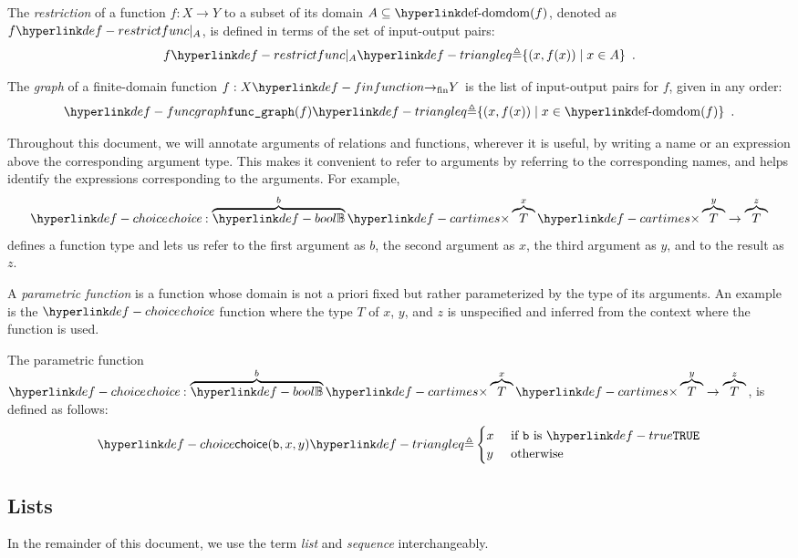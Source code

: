 \begin{definition}
\hypertarget{def-restrictfunc}{}
The \emph{restriction} of a function $f : X \rightarrow Y$ to a subset of its domain
$A \subseteq \dom(f)$, denoted as $\restrictfunc{f}{A}$, is defined
in terms of the set of input-output pairs:
\[
  \restrictfunc{f}{A} \triangleq \{ (x, f(x)) \;|\; x \in A \} \enspace.
\]
\end{definition}

\begin{definition}
\hypertarget{def-funcgraph}{}
The \emph{graph} of a finite-domain function $f : X \rightarrowfin Y$
is the list of input-output pairs for $f$, given in any order:
\[
\funcgraph(f) \triangleq \{ (x, f(x)) \;|\; x \in \dom(f) \} \enspace.
\]
\end{definition}

Throughout this document, we will annotate arguments of relations and functions, wherever it is useful,
by writing a name or an expression above the corresponding argument type.
This makes it convenient to refer to arguments by referring to the corresponding names, and helps identify
the expressions corresponding to the arguments.
For example,
\[
    \choicename : \overname{\Bool}{b} \cartimes \overname{T}{x} \cartimes \overname{T}{y} \rightarrow \overname{T}{z}
\]
defines a function type and lets us refer to the first argument as $b$, the second argument as $x$,
the third argument as $y$, and to the result as $z$.

A \emph{parametric function} is a function whose domain is not a priori fixed but rather
parameterized by the type of its arguments. An example is the $\choicename$ function where the type $T$ of
$x$, $y$, and $z$ is unspecified and inferred from the context where the function is used.

\hypertarget{def-choice}{}
\begin{definition}[Choice]
The parametric function $\choicename : \overname{\Bool}{b} \cartimes \overname{T}{x} \cartimes \overname{T}{y} \rightarrow \overname{T}{z}$,
is defined as follows:
\[
  \choice{\vb}{x}{y} \triangleq
  \begin{cases}
    x & \text{ if }\vb \text{ is }\True\\
    y & \text{ otherwise}\\
  \end{cases}
\]
\end{definition}

\subsection{Lists}
In the remainder of this document, we use the term \emph{list} and \emph{sequence} interchangeably.

